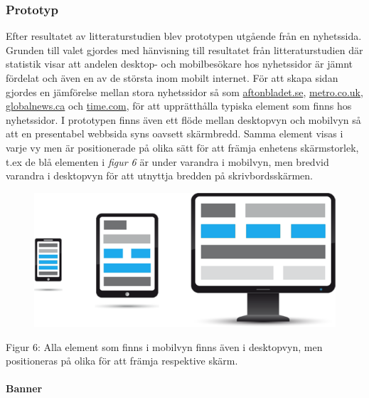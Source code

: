 \documentclass[11pt]{article}
\begin{document}
\subsubsection{Prototyp}
Efter resultatet av litteraturstudien blev prototypen utgående från en nyhetssida. Grunden till valet gjordes med hänvisning till resultatet från litteraturstudien där statistik visar att andelen desktop- och mobilbesökare hos nyhetssidor är jämnt fördelat och även en av de största inom mobilt internet. För att skapa sidan gjordes en jämförelse mellan stora nyhetssidor så som \href{http://www.aftonbladet.se}{aftonbladet.se}, \href{http://www.metro.co.uk}{metro.co.uk}, \href{http://www.globalnews.ca}{globalnews.ca} och \href{http://www.time.com}{time.com}, för att upprätthålla typiska element som finns hos nyhetssidor. I prototypen finns även ett flöde mellan desktopvyn och mobilvyn så att en presentabel webbsida syns oavsett skärmbredd. Samma element visas i varje vy men är positionerade på olika sätt för att främja enhetens skärmstorlek, t.ex de blå elementen i \textit{figur 6} är under varandra i mobilvyn, men bredvid varandra i desktopvyn för att utnyttja bredden på skrivbordsskärmen.

\vspace{0.3cm}
\begin{figure}[H]
\centerline{%
\hspace{1.5cm}
\includegraphics[scale=0.4]{pics/responsivebildimp.png}\\
}
\end{figure}
Figur 6: Alla element som finns i mobilvyn finns även i desktopvyn, men positioneras på olika för att främja respektive skärm.

\paragraph{Banner}\mbox{}
\end{document}
